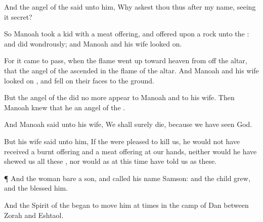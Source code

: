 {And the
angel of the
{}
said unto him, Why
askest thou thus after my
name, seeing it
{}
secret?

So
Manoah
took a
kid with a meat
offering, and
offered
{} upon a
rock unto the
{}: and
{}
did
wondrously; and
Manoah and his
wife looked
on.

For it came to pass, when the
flame went
up toward
heaven from off the
altar, that the
angel of the
{}
ascended in the
flame of the
altar. And
Manoah and his
wife looked
on
{}, and fell
on their
faces to the
ground.

But the
angel of the
{} did no
more
appear to
Manoah and to his
wife. Then
Manoah
knew that he
{} an
angel of the
{}.

And
Manoah
said unto his
wife, We shall
surely
die, because we have
seen
God.

But his
wife
said unto him,
If the
{} were
pleased to
kill us, he would not have
received a burnt
offering and a meat
offering at our
hands, neither would he have
shewed us all these
{}, nor would as at this
time have
told us
{} as
these.


\par }{\PP {}¶ And the
woman
bare a
son, and
called his
name
Samson: and the
child
grew, and the
{}
blessed him.

And the
Spirit of the
{}
began to move him at
times in the
camp of
Dan between
Zorah and
Eshtaol.




\par }
